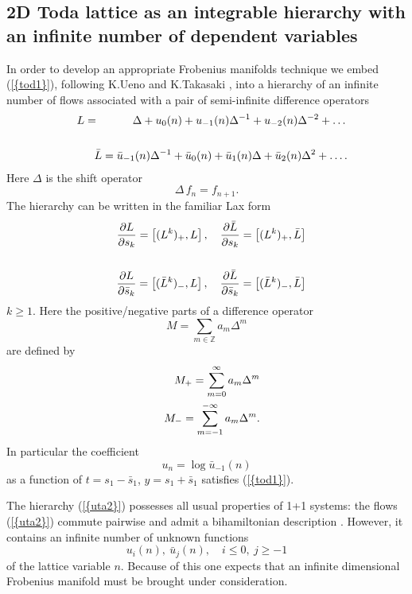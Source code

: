\documentclass[numbook, envcountsame, envcountreset]{svjour3}
\begin{document}
\subsection{\bf 2D Toda lattice as an integrable hierarchy with an infinite number of dependent variables}\par 
In order to develop an appropriate Frobenius manifolds technique we embed {(\ref{{tod1}})}, following K.Ueno and K.Takasaki \cite{ut}, into a hierarchy of an infinite number of flows associated with a pair of semi-infinite difference operators
\begin{eqnarray}\label{uta1}
&&
L=\qquad\quad\Delta + u_0(n) +u_{-1}(n) \Delta^{-1}+u_{-2}(n)\Delta^{-2}+\dots
{\nonumber}\\
&&
\\
&& 
\bar L = \bar u_{-1}(n) \Delta^{-1} + \bar u_0(n) + \bar u_1(n) \Delta +\bar u_2(n) \Delta^2+\dots .
{\nonumber}
\end{eqnarray}
Here $\Delta$ is the shift operator
$$
\Delta \, f_n =f_{n+1}.
$$
The hierarchy can be written in the familiar Lax form
\begin{eqnarray}\label{uta2}
&&
\frac{{\partial} L}{{\partial} s_k} =\left[ (L^k)_+, L\right], \quad \frac{{\partial} \bar L}{{\partial} s_k} =\left[ (L^k)_+, \bar L\right]
{\nonumber}\\
&&
\\
&&
\frac{{\partial} L}{{\partial} \bar s_k} =\left[ (\bar L^k)_-, L\right], \quad \frac{{\partial} \bar L}{{\partial} \bar s_k} =\left[ (\bar L^k)_-, \bar L\right]
{\nonumber}
\end{eqnarray}
$k\geq 1$. Here the positive/negative parts of a difference operator 
$$
M=\sum_{m\in \mathbb Z}  a_m \Delta^m
$$
are defined by
\begin{eqnarray}
&&
M_+ = \sum_{m=0}^\infty  a_m \Delta^m
{\nonumber}\\
&&
M_-=\sum_{m=-1}^{-\infty}  a_m \Delta^m.
{\nonumber}
\end{eqnarray}
In particular the coefficient
$$
u_n=\log \bar u_{-1}(n)
$$
as a function of $t=s_1-\bar s_1$, $y=s_1+\bar s_1$ satisfies {(\ref{{tod1}})}.

The hierarchy {(\ref{{uta2}})} possesses all usual properties of 1+1 systems: the flows {(\ref{{uta2}})} commute pairwise and admit a bihamiltonian description \cite{ca1}.
However, it contains an infinite number of unknown functions 
$$
u_i(n), ~ \bar u_j(n), \quad i\leq 0, ~ j\geq -1
$$ 
of the lattice variable $n$. Because of this one expects that an infinite dimensional Frobenius manifold must be brought under consideration.
\end{document}
